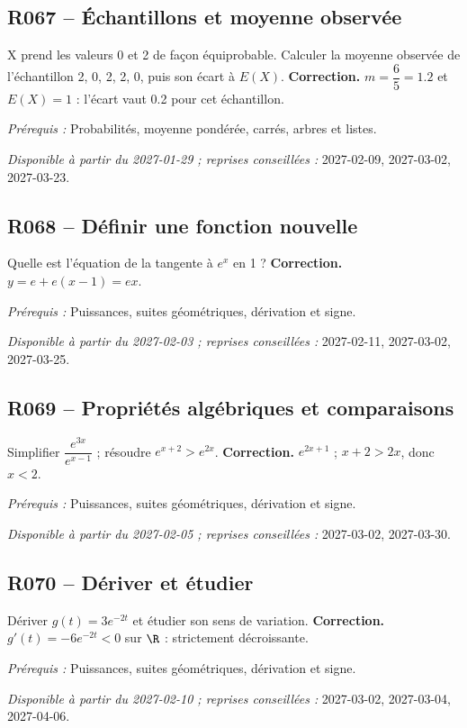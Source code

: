 \subsection*{R067 -- Échantillons et moyenne observée}\label{R067}
X prend les valeurs 0 et 2 de façon équiprobable. Calculer la moyenne observée de l’échantillon 2, 0, 2, 2, 0, puis son écart à $E(X)$.
\ifmxteacher\textbf{Correction.} $m=\dfrac{6}{5}=\num{1,2}$ et $E(X)=1$ : l’écart vaut \num{0,2} pour cet échantillon.\par\textit{Prérequis :} Probabilités, moyenne pondérée, carrés, arbres et listes.\par\textit{Disponible à partir du 2027-01-29 ; reprises conseillées :} 2027-02-09, 2027-03-02, 2027-03-23.\fi
{}\subsection*{R068 -- Définir une fonction nouvelle}\label{R068}
Quelle est l’équation de la tangente à $e^x$ en 1 ?
\ifmxteacher\textbf{Correction.} $y=e+e(x-1)=ex$.\par\textit{Prérequis :} Puissances, suites géométriques, dérivation et signe.\par\textit{Disponible à partir du 2027-02-03 ; reprises conseillées :} 2027-02-11, 2027-03-02, 2027-03-25.\fi
{}\subsection*{R069 -- Propriétés algébriques et comparaisons}\label{R069}
Simplifier $\dfrac{e^{3x}}{e^{x-1}}$ ; résoudre $e^{x+2}>e^{2x}$.
\ifmxteacher\textbf{Correction.} $e^{2x+1}$ ; $x+2>2x$, donc $x<2$.\par\textit{Prérequis :} Puissances, suites géométriques, dérivation et signe.\par\textit{Disponible à partir du 2027-02-05 ; reprises conseillées :} 2027-03-02, 2027-03-30.\fi
{}\subsection*{R070 -- Dériver et étudier}\label{R070}
Dériver $g(t)=3e^{-2t}$ et étudier son sens de variation.
\ifmxteacher\textbf{Correction.} $g\prime(t)=-6e^{-2t}<0$ sur $\R$ : strictement décroissante.\par\textit{Prérequis :} Puissances, suites géométriques, dérivation et signe.\par\textit{Disponible à partir du 2027-02-10 ; reprises conseillées :} 2027-03-02, 2027-03-04, 2027-04-06.\fi
